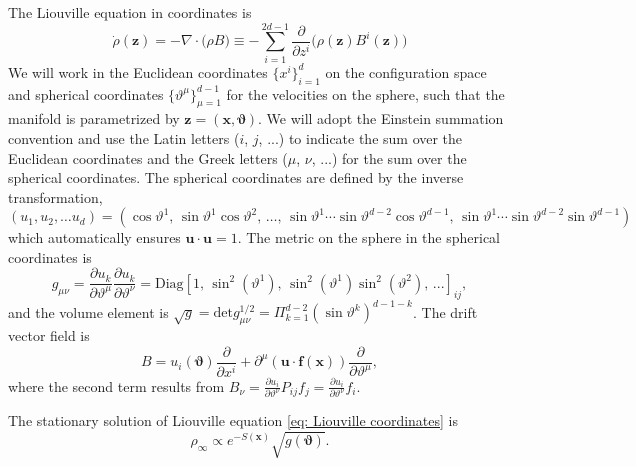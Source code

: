 \documentclass[tablecaption=bottom,wcp]{jmlr} %
\newcommand{\x}{\boldsymbol{x}}
\newcommand{\U}{\boldsymbol{u}}
\newcommand{\Z}{\boldsymbol{z}}
\newcommand{\Th}{\boldsymbol{\vartheta}}
\begin{document}
The Liouville equation in coordinates is
\begin{equation} \label{eq: Liouville coordinates}
    \dot{\rho}(\Z) = -\nabla \cdot \big(\rho B \big) \equiv - \sum_{i = 1}^{2d - 1} \frac{\partial}{\partial z^{i}} \big( \rho(\Z) B^{i}(\Z) \big)
\end{equation}
We will work in the Euclidean coordinates $\{ x^i\}_{i = 1}^{d}$ on the configuration space and spherical coordinates $\{ \vartheta^{\mu}\}_{\mu = 1}^{d-1}$  for the velocities on the sphere, such that the manifold is parametrized by $\Z = (\x, \boldsymbol{\vartheta})$. We will adopt the Einstein summation convention and use the Latin letters ($i$, $j$, ...) to indicate the sum over the Euclidean coordinates and the Greek letters ($\mu$, $\nu$, ...) for the sum over the spherical coordinates. The spherical coordinates are defined by the inverse transformation,
\begin{equation} 
(u_1, u_2, \ldots u_{d}) =  (\cos \vartheta^1,\,
\sin \vartheta^1 \cos \vartheta^2,\,
\ldots ,\,
\sin \vartheta^1 \cdots \sin \vartheta^{d-2} \cos \vartheta^{d-1},\,
\sin \vartheta^1 \cdots \sin \vartheta^{d-2} \sin \vartheta^{d-1})
\end{equation}
which automatically ensures $\U \cdot \U = 1$. The metric on the sphere in the spherical coordinates is
\begin{equation} 
    g_{\mu \nu} = \frac{\partial u_k}{\partial \vartheta^{\mu}} \frac{\partial u_k}{\partial \vartheta^{{\nu}}} = \mathrm{Diag}[1,\, \sin^2(\vartheta^1),\, \sin^2(\vartheta^1) \sin^2(\vartheta^2),\, ...]_{i j},
\end{equation}
and the volume element is $\sqrt{g} = \mathrm{det} g_{\mu \nu}^{1/2} = \Pi_{k=1}^{d-2}(\sin \vartheta^k)^{d-1-k}$.
The drift vector field is
\begin{equation} \label{eq: drift}
    B = u_i(\Th) \frac{\partial}{\partial x^i} + \partial^{\mu}(\U \cdot 
    \boldsymbol{f}(\x)) \frac{\partial}{\partial \vartheta^{\mu}},
\end{equation}
where the second term results from
$B_{\nu} = \frac{\partial u_i}{\partial \vartheta^{\nu}} P_{ij} f_j = \frac{\partial u_i}{\partial \vartheta^{\nu}} f_i$.


\begin{theorem}
The stationary solution of Liouville equation \eqref{eq: Liouville coordinates} is 
\begin{equation} \label{eq: stationary distribution}
    \rho_{\infty} \propto e^{-S(\x)} \sqrt{g(\Th)} . 
\end{equation}
\end{theorem}
\end{document}
